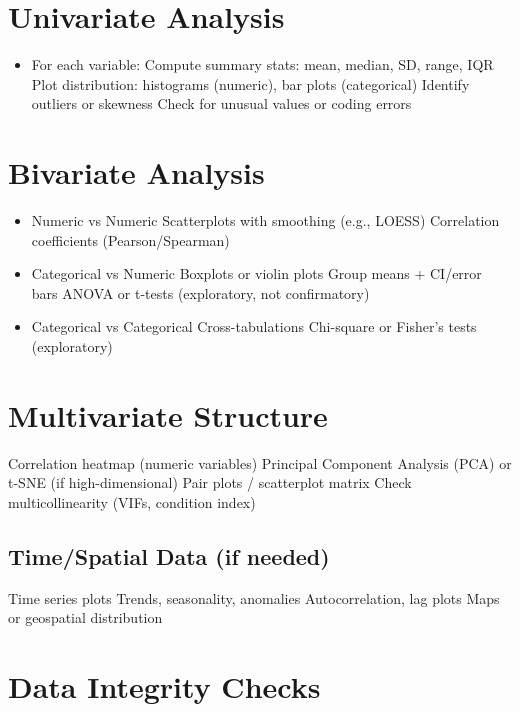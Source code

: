\documentclass[
  11pt,
  letterpaper,
  DIV=11,
  numbers=noendperiod]{scrartcl}
\providecommand{\tightlist}{%
  \setlength{\itemsep}{0pt}\setlength{\parskip}{0pt}}\usepackage{longtable,booktabs,array}
\begin{document}
\section{Univariate Analysis}\label{univariate-analysis}

\begin{itemize}
\tightlist
\item
  For each variable: Compute summary stats: mean, median, SD, range, IQR
  Plot distribution: histograms (numeric), bar plots (categorical)
  Identify outliers or skewness Check for unusual values or coding
  errors
\end{itemize}

\section{Bivariate Analysis}\label{bivariate-analysis}

\begin{itemize}
\tightlist
\item
  Numeric vs Numeric Scatterplots with smoothing (e.g., LOESS)
  Correlation coefficients (Pearson/Spearman)
\item
  Categorical vs Numeric Boxplots or violin plots Group means + CI/error
  bars ANOVA or t-tests (exploratory, not confirmatory)
\item
  Categorical vs Categorical Cross-tabulations Chi-square or Fisher's
  tests (exploratory)
\end{itemize}

\section{Multivariate Structure}\label{multivariate-structure}

Correlation heatmap (numeric variables) Principal Component Analysis
(PCA) or t-SNE (if high-dimensional) Pair plots / scatterplot matrix
Check multicollinearity (VIFs, condition index)

\subsection{Time/Spatial Data (if
needed)}\label{timespatial-data-if-needed}

Time series plots Trends, seasonality, anomalies Autocorrelation, lag
plots Maps or geospatial distribution

\section{Data Integrity Checks}\label{data-integrity-checks}
\end{document}
